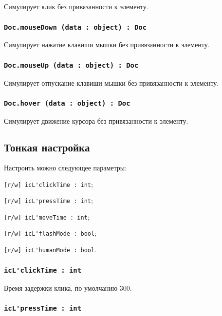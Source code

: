Симулирует клик без привязанности к элементу.

\subsubsection{\lstinline|Doc.mouseDown (data : object) : Doc|}

Симулирует нажатие клавиши мышки без привязанности к элементу.

\subsubsection{\lstinline|Doc.mouseUp (data : object) : Doc|}

Симулирует отпускание клавиши мышки без привязанности к элементу.

\subsubsection{\lstinline|Doc.hover (data : object) : Doc|}

Симулирует движение курсора без привязанности к элементу.

\subsection{Тонкая настройка}

Настроить можно следующее параметры:
\begin{icItems}
	\item \lstinline|[r/w] icL'clickTime : int|;
	\item \lstinline|[r/w] icL'pressTime : int|;
	\item \lstinline|[r/w] icL'moveTime : int|;
	\item \lstinline|[r/w] icL'flashMode : bool|;
	\item \lstinline|[r/w] icL'humanMode : bool|.
\end{icItems}

\subsubsection{\lstinline|icL'clickTime : int|}

Время задержки клика, по умолчанию 300.

\subsubsection{\lstinline|icL'pressTime : int|}

